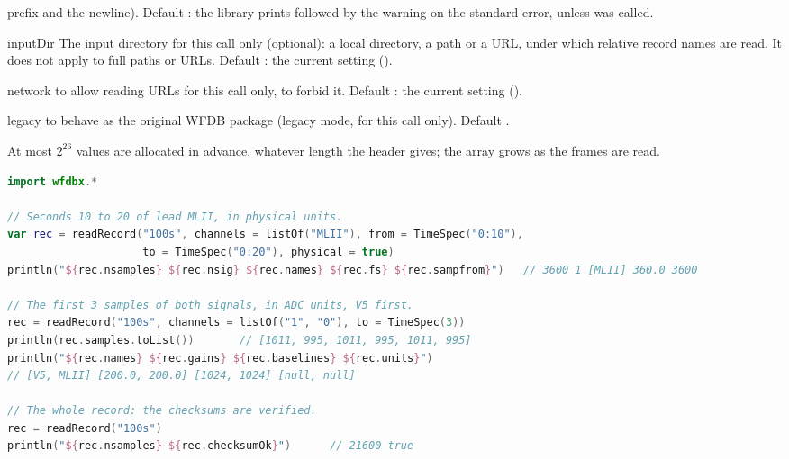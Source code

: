 \begin{params}
  prefix and the newline). Default : the library prints 
  followed by the warning on the standard error, unless  was called.
\item[inputDir] The input directory for this call only (optional): a local directory, a
  \code{\textasciitilde} path or a URL, under which relative record names are read. It
  does not apply to full paths or URLs. Default : the current setting
  ().
\item[network]  to allow reading URLs for this call only,  to
  forbid it. Default : the current setting ().
\item[legacy]  to behave as the original WFDB package (legacy mode, for this
  call only). Default .
\end{params}
At most $2^{26}$ values are allocated in advance, whatever length the header gives; the
array grows as the frames are read.
\begin{lstlisting}[language=Kotlin,style=example]
import wfdbx.*

// Seconds 10 to 20 of lead MLII, in physical units.
var rec = readRecord("100s", channels = listOf("MLII"), from = TimeSpec("0:10"),
                     to = TimeSpec("0:20"), physical = true)
println("${rec.nsamples} ${rec.nsig} ${rec.names} ${rec.fs} ${rec.sampfrom}")   // 3600 1 [MLII] 360.0 3600

// The first 3 samples of both signals, in ADC units, V5 first.
rec = readRecord("100s", channels = listOf("1", "0"), to = TimeSpec(3))
println(rec.samples.toList())       // [1011, 995, 1011, 995, 1011, 995]
println("${rec.names} ${rec.gains} ${rec.baselines} ${rec.units}")
// [V5, MLII] [200.0, 200.0] [1024, 1024] [null, null]

// The whole record: the checksums are verified.
rec = readRecord("100s")
println("${rec.nsamples} ${rec.checksumOk}")      // 21600 true
\end{lstlisting}
